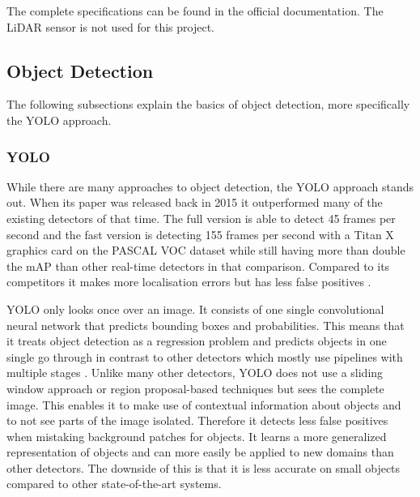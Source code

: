 The complete specifications can be found in the official documentation. The LiDAR sensor is not used for this project.

\subsection{Object Detection}

The following subsections explain the basics of object detection, more specifically the \ac{YOLO} approach.

\subsubsection{YOLO}

While there are many approaches to object detection, the \ac{YOLO} approach stands out. When its paper was released back in 2015 it outperformed many of the existing detectors of that time. The full version is able to detect 45 frames per second and the fast version is detecting 155 frames per second with a Titan X graphics card on the PASCAL VOC dataset while still having more than double the \ac{mAP} than other real-time detectors in that comparison. Compared to its competitors it makes more localisation errors but has less false positives \autocite{yolo}.

\ac{YOLO} only looks once over an image. It consists of one single convolutional neural network that predicts bounding boxes and probabilities. This means that it treats object detection as a regression problem and predicts objects in one single go through in contrast to other detectors which mostly use pipelines with multiple stages \autocite{yolo}.
Unlike many other detectors, \ac{YOLO} does not use a sliding window approach or region proposal-based techniques but sees the complete image. This enables it to make use of contextual information about objects and to not see parts of the image isolated. Therefore it detects less false positives when mistaking background patches for objects. It learns a more generalized representation of objects and can more easily be applied to new domains than other detectors. The downside of this is that it is less accurate on small objects compared to other state-of-the-art systems.

